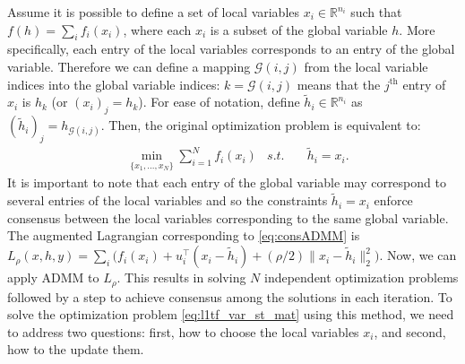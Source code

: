 \documentclass[letterpaper]{article} %
\DeclareMathOperator*{\argmin}{argmin}
\newcommand{\attn}[1]{\textcolor{red}{TODO: #1}}
\newcommand{\norm}[1]{\left\lVert #1 \right\rVert}
\begin{document}
Assume it is possible to define a set of local variables
$x_i \in \mathbb{R}^{n_i}$ such that $f(h)=\sum_i f_i(x_i)$, where
each $x_i$ is a subset of the global variable $h$. More specifically,
each entry of the local variables corresponds to an entry of the
global variable. Therefore we can define a mapping $\mathscr{G}(i,j)$
from the local variable indices into the global variable indices:
$k=\mathscr{G}(i,j)$ means that the $j^\text{th}$ entry of $x_i$ is
$h_k$ (or $(x_i)_j=h_k$). For ease of notation, define $\tilde{h}_i
\in \mathbb{R}^{n_i}$ as $(\tilde{h}_i)_j=h_{\mathscr{G}(i,j)}$. Then,
the original optimization problem is equivalent to:  
\begin{equation}
\begin{aligned}
&\min_{\{x_1,...,x_N  \}} \sum_{i=1}^N f_i(x_i) &
s.t. &\quad \tilde{h}_i=x_i.
\end{aligned}
\label{eq:consADMM}
\end{equation}
It is important to note that each entry of the global variable may
correspond to several entries of the local variables and so the
constraints $\tilde{h}_i=x_i$ enforce consensus between the local
variables corresponding to the same global variable.  
The augmented Lagrangian corresponding to 
\eqref{eq:consADMM} is $L_\rho(x,h,y)=\sum_i
\big(f_i(x_i)+u_i^\top(x_i-\tilde{h}_i) + (\rho/2) \lVert
x_i-\tilde{h}_i \lVert_2^2 \big)$. Now, we can apply ADMM to
$L_\rho$. This results in solving $N$ independent optimization
problems followed by a step to achieve consensus among the solutions
in each iteration. 
To solve the optimization problem \eqref{eq:l1tf_var_st_mat} using
this method, we need to address two 
questions: first, how to choose the 
local variables $x_i$, and second, how to the update them.
\end{document}
